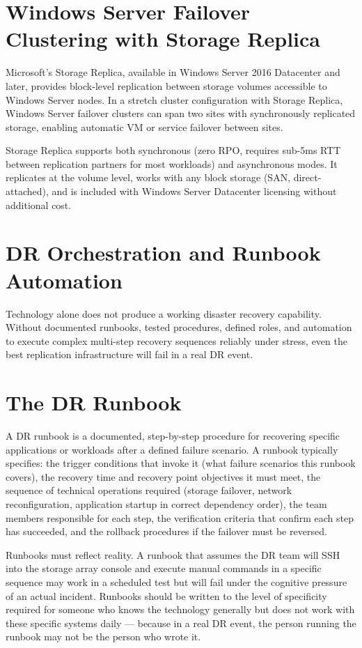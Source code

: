 \section{Windows Server Failover Clustering with Storage Replica}
Microsoft's Storage Replica, available in Windows Server 2016 Datacenter and later, provides block-level replication between storage volumes accessible to Windows Server nodes. In a stretch cluster configuration with Storage Replica, Windows Server failover clusters can span two sites with synchronously replicated storage, enabling automatic VM or service failover between sites.

Storage Replica supports both synchronous (zero RPO, requires sub-5ms RTT between replication partners for most workloads) and asynchronous modes. It replicates at the volume level, works with any block storage (SAN, direct-attached), and is included with Windows Server Datacenter licensing without additional cost.

\section{DR Orchestration and Runbook Automation}
Technology alone does not produce a working disaster recovery capability. Without documented runbooks, tested procedures, defined roles, and automation to execute complex multi-step recovery sequences reliably under stress, even the best replication infrastructure will fail in a real DR event.

\section{The DR Runbook}
A DR runbook is a documented, step-by-step procedure for recovering specific applications or workloads after a defined failure scenario. A runbook typically specifies: the trigger conditions that invoke it (what failure scenarios this runbook covers), the recovery time and recovery point objectives it must meet, the sequence of technical operations required (storage failover, network reconfiguration, application startup in correct dependency order), the team members responsible for each step, the verification criteria that confirm each step has succeeded, and the rollback procedures if the failover must be reversed.

Runbooks must reflect reality. A runbook that assumes the DR team will SSH into the storage array console and execute manual commands in a specific sequence may work in a scheduled test but will fail under the cognitive pressure of an actual incident. Runbooks should be written to the level of specificity required for someone who knows the technology generally but does not work with these specific systems daily --- because in a real DR event, the person running the runbook may not be the person who wrote it.

